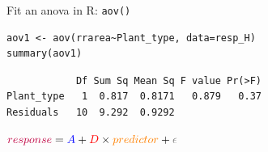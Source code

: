 \documentclass[10pt]{beamer}
\makeatletter
\newenvironment{kframe}{%
 \def\at@end@of@kframe{}%
 \ifinner\ifhmode%
  \def\at@end@of@kframe{\end{minipage}}%
  \begin{minipage}{\columnwidth}%
 \fi\fi%
 \def\FrameCommand##1{\hskip\@totalleftmargin \hskip-\fboxsep
 \colorbox{shadecolor}{##1}\hskip-\fboxsep
     \hskip-\linewidth \hskip-\@totalleftmargin \hskip\columnwidth}%
 \MakeFramed {\advance\hsize-\width
   \@totalleftmargin\z@ \linewidth\hsize
   \@setminipage}}%
 {\par\unskip\endMakeFramed%
 \at@end@of@kframe}
\newenvironment{knitrout}{}{} %
\makeatother
\begin{document}
\begin{frame}[fragile]{Fit an anova in R: \texttt{aov()}}

\begin{knitrout}
\color{fgcolor}\begin{kframe}
\begin{verbatim}
aov1 <- aov(rrarea~Plant_type, data=resp_H)
summary(aov1)
\end{verbatim}
\end{kframe}
\end{knitrout}

\vspace{-0.15cm}
\pause
\begin{knitrout}
\color{fgcolor}\begin{kframe}
\footnotesize
\begin{verbatim}
            Df Sum Sq Mean Sq F value Pr(>F)
Plant_type   1  0.817  0.8171   0.879   0.37
Residuals   10  9.292  0.9292  
\end{verbatim}
\end{kframe}
\end{knitrout}

\pause
${\color{purple}{response}} = {\color{blue}{A}} + {\color{red}{D}} \times {\color{orange}{predictor}} + {\color{gray}{\epsilon}}$

\end{frame}
\end{document}
